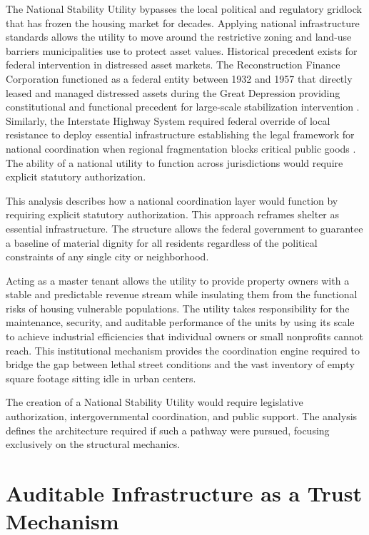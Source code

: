 \documentclass[12pt, letterpaper]{article}
\begin{document}
The National Stability Utility bypasses the local political and regulatory gridlock that has frozen the housing market for decades. Applying national infrastructure standards allows the utility to move around the restrictive zoning and land-use barriers municipalities use to protect asset values. Historical precedent exists for federal intervention in distressed asset markets. The Reconstruction Finance Corporation functioned as a federal entity between 1932 and 1957 that directly leased and managed distressed assets during the Great Depression providing constitutional and functional precedent for large-scale stabilization intervention \citep{jones_1951}. Similarly, the Interstate Highway System required federal override of local resistance to deploy essential infrastructure establishing the legal framework for national coordination when regional fragmentation blocks critical public goods \citep{rose_1990}. The ability of a national utility to function across jurisdictions would require explicit statutory authorization.

This analysis describes how a national coordination layer would function by requiring explicit statutory authorization. This approach reframes shelter as essential infrastructure. The structure allows the federal government to guarantee a baseline of material dignity for all residents regardless of the political constraints of any single city or neighborhood.

Acting as a master tenant allows the utility to provide property owners with a stable and predictable revenue stream while insulating them from the functional risks of housing vulnerable populations. The utility takes responsibility for the maintenance, security, and auditable performance of the units by using its scale to achieve industrial efficiencies that individual owners or small nonprofits cannot reach. This institutional mechanism provides the coordination engine required to bridge the gap between lethal street conditions and the vast inventory of empty square footage sitting idle in urban centers.

The creation of a National Stability Utility would require legislative authorization, intergovernmental coordination, and public support. The analysis defines the architecture required if such a pathway were pursued, focusing exclusively on the structural mechanics.

\section{Auditable Infrastructure as a Trust Mechanism}
\end{document}
